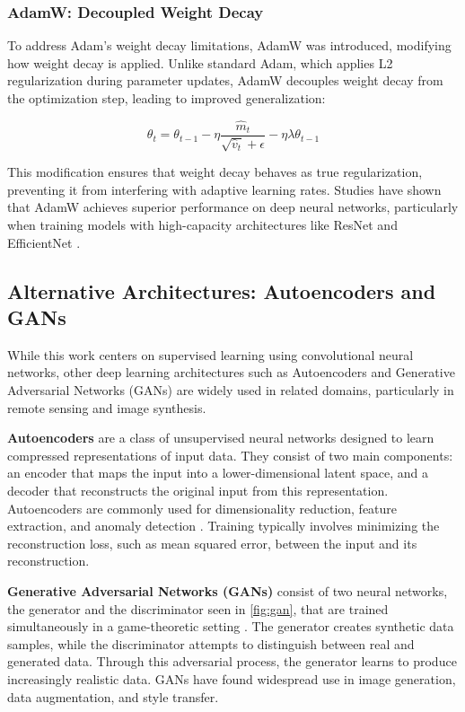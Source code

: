 \subsubsection{AdamW: Decoupled Weight Decay}

To address Adam's weight decay limitations, AdamW \cite{loshchilov2019decoupled} 
was introduced, modifying how weight decay is applied. Unlike standard Adam, 
which applies L2 regularization during parameter updates, AdamW decouples weight 
decay from the optimization step, leading to improved generalization:

\begin{equation}
    \theta_t = \theta_{t-1} - \eta \frac{\hat{m}_t}{\sqrt{\hat{v}_t} + \epsilon} - \eta \lambda \theta_{t-1}
\end{equation}

This modification ensures that weight decay behaves as true regularization, preventing 
it from interfering with adaptive learning rates. Studies have shown that AdamW 
achieves superior performance on deep neural networks, particularly when training 
models with high-capacity architectures like ResNet and EfficientNet \cite{loshchilov2019decoupled}.


\subsection{Alternative Architectures: Autoencoders and GANs}

While this work centers on supervised learning using convolutional neural networks, other deep learning architectures such as Autoencoders and Generative Adversarial Networks (GANs) are widely used in related domains, particularly in remote sensing and image synthesis.

\textbf{Autoencoders} are a class of unsupervised neural networks designed to learn compressed representations of input data. They consist of two main components: an encoder that maps the input into a lower-dimensional latent space, and a decoder that reconstructs the original input from this representation. Autoencoders are commonly used for dimensionality reduction, feature extraction, and anomaly detection \cite{goodfellow2016deep}. Training typically involves minimizing the reconstruction loss, such as mean squared error, between the input and its reconstruction.

\textbf{Generative Adversarial Networks (GANs)} consist of two neural networks, 
the generator and the discriminator seen in \ref{fig:gan}, that are trained 
simultaneously in a game-theoretic setting \cite{NIPS2014_5ca3e9b1}. The generator creates synthetic data samples, while the discriminator attempts to distinguish between real and generated data. Through this adversarial process, the generator learns to produce increasingly realistic data. GANs have found widespread use in image generation, data augmentation, and style transfer.

